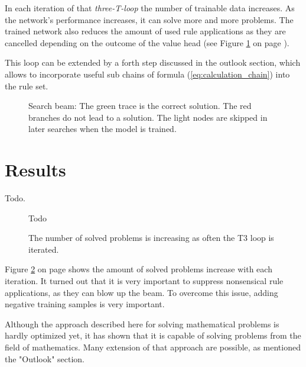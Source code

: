 \documentclass{scrartcl}
\theoremstyle{definition}
\begin{document}
In each iteration of that \textit{three-T-loop} the number of trainable data increases. 
As the network's performance increases, it can solve more and more problems.
The trained network also reduces the amount of used rule applications as they are cancelled depending on the outcome of the value head (see Figure \ref{fig:beam_search} on page \pageref{fig:beam_search}). 


This loop can be extended by a forth step discussed in the outlook section, which allows to incorporate useful sub chains of formula (\ref{eq:calculation_chain}) into the rule set.

\begin{figure}[!htbp]
	\centering
	
	\caption{Search beam: The green trace is the correct solution.
	The red branches do not lead to a solution.
	The light nodes are skipped in later searches when the model is trained.}
	\label{fig:beam_search}
\end{figure}


\section{Results}

Todo.

\begin{figure}[!htbp]
	\centering
	Todo
	\caption{The number of solved problems is increasing as often the T3 loop is iterated.}
	\label{fig:t3loop_performance}
\end{figure}

Figure \ref{fig:t3loop_performance} on page \pageref{fig:t3loop_performance} shows the amount of solved problems increase with each iteration. 
It turned out that it is very important to suppress nonsensical rule applications, as they can blow up the beam.
To overcome this issue, adding negative training samples is very important.


Although the approach described here for solving mathematical problems is hardly optimized yet,
it has shown that it is capable of solving problems from the field of mathematics.
Many extension of that approach are possible, as mentioned the "Outlook" section.
\end{document}
